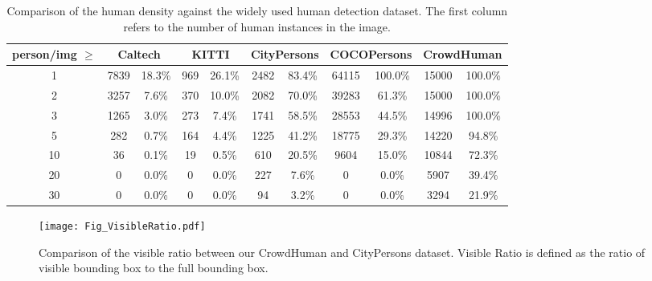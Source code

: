 \documentclass[10pt,twocolumn,letterpaper]{article}
\begin{document}
\begin{table*}
\begin{center}
\begin{tabular}{c|cc|cc|cc|cc|cc}
{person/img $\ge$} & \multicolumn{2}{c}{Caltech} & \multicolumn{2}{c}{KITTI} & \multicolumn{2}{c}{CityPersons} & \multicolumn{2}{c}{COCOPersons} & \multicolumn{2}{c}{CrowdHuman} \\
\hline
{1} & {7839} & {18.3\%} & {969} & {26.1\%} & {2482} & {83.4\%} & {64115} & {100.0\%} & {15000} & {100.0\%} \\
{2} & {3257} & {7.6\%} & {370} & {10.0\%} & {2082} & {70.0\%} & {39283} & {61.3\%} & {15000} & {100.0\%} \\
{3} & {1265} & {3.0\%} & {273} & {7.4\%} & {1741} & {58.5\%} & {28553} & {44.5\%} & {14996} & {100.0\%} \\
{5} & {282} & {0.7\%} & {164} & {4.4\%} & {1225} & {41.2\%} & {18775} & {29.3\%} & {14220} & {94.8\%} \\
{10} & {36} & {0.1\%} & {19} & {0.5\%} & {610} & {20.5\%} & {9604} & {15.0\%} & {10844} & {72.3\%} \\
{20} & {0} & {0.0\%} & {0} & {0.0\%} & {227} & {7.6\%} & {0} & {0.0\%} & {5907} & {39.4\%} \\
{30} & {0} & {0.0\%} & {0} & {0.0\%} & {94} & {3.2\%} & {0} & {0.0\%} & {3294} & {21.9\%} \\
\end{tabular}
\caption{Comparison of the human density against the widely used human detection dataset. The first column refers to the number of human instances in the image. } \label{tab:density}
\end{center}
\end{table*}


\begin{figure*}
\centering
\texttt{[image: Fig\_VisibleRatio.pdf]}
\caption{Comparison of the visible ratio between our CrowdHuman and CityPersons dataset. Visible Ratio is defined as the ratio of visible bounding box to the full bounding box.}
\label{fig:visRatio}
\end{figure*}
\end{document}
